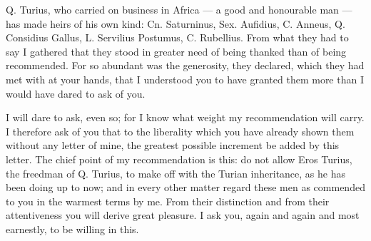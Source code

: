 

 Q. Turius, who carried on business in Africa --- a good and honourable man --- has made heirs of his own kind: Cn. Saturninus, Sex. Aufidius, C. Anneus, Q. Considius Gallus, L. Servilius Postumus, C. Rubellius. From what they had to say I gathered that they stood in greater need of being thanked than of being recommended. For so abundant was the generosity, they declared, which they had met with at your hands, that I understood you to have granted them more than I would have dared to ask of you.

 I will dare to ask, even so; for I know what weight my recommendation will carry. I therefore ask of you that to the liberality which you have already shown them without any letter of mine, the greatest possible increment be added by this letter. The chief point of my recommendation is this: do not allow Eros Turius, the freedman of Q. Turius, to make off with the Turian inheritance, as he has been doing up to now; and in every other matter regard these men as commended to you in the warmest terms by me. From their distinction and from their attentiveness you will derive great pleasure. I ask you, again and again and most earnestly, to be willing in this.
